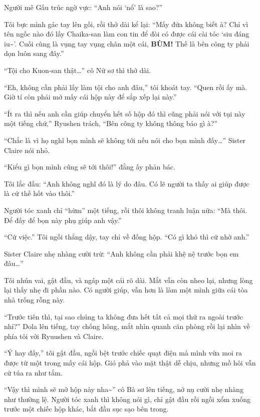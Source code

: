 \documentclass[../main.tex]{subfiles}
\begin{document}
Người mê Gấu trúc ngờ vực: ``Anh nói `nổ' là sao?''

Tôi bực mình gác tay lên gối, rồi thở dài kể lại: ``Mấy đứa không biết à? Chỉ vì tên ngốc nào đó lấy Chaika-san làm con tin để đòi có được cái cài tóc `siu đáng iu\~{}'. Cuối cùng là vụng tay vụng chân một cái, \textbf{BÙM!} Thế là bên công ty phải dọn luôn sang đây.''

``Tội cho Kuon-san thật\dots'' cô Nữ sơ thì thở dài.

``Eh, không cần phải lấy làm tội cho anh đâu,'' tôi khoát tay. ``Quen rồi ấy mà. Giờ tí còn phải mở mấy cái hộp này để sắp xếp lại này.''

``Ít ra thì nếu anh cần giúp chuyển hết số hộp đó thì cũng phải nói với tụi này một tiếng chứ,'' Ryushen trách, ``Bên công ty không thông báo gì à?''

``Chắc là vì họ nghĩ bọn mình sẽ không tới nếu nói cho bọn mình đấy\dots'' Sister Claire nói nhỏ.

``Kiểu gì bọn mình cũng sẽ tới thôi!'' đằng ấy phản bác.

Tôi lắc đầu: ``Anh không nghĩ đó là lý do đâu. Có lẽ người ta thấy ai giúp được là cứ thế hốt vào thôi.''

Người tóc xanh chỉ ``hừm'' một tiếng, rồi thôi không tranh luận nữa: ``Mà thôi. Để đấy để bọn này phụ giúp anh vậy.''

``Cứ việc.'' Tôi ngồi thẳng dậy, tay chỉ về đống hộp. ``Có gì khó thì cứ nhờ anh.''

Sister Claire nhẹ nhàng cười trừ: ``Anh không cần phải khệ nệ trước bọn em đâu\dots''

Tôi nhún vai, gật đầu, và ngáp một cái rõ dài. Mắt vẫn còn nheo lại, nhưng lòng lại thấy nhẹ đi phần nào. Có người giúp, vẫn hơn là làm một mình giữa cái tòa nhà trống rỗng này.

\ct

``Trước tiên thì, tại sao chúng ta không đưa hết tất cả mọi thứ ra ngoài trước nhỉ?'' Dola lên tiếng, tay chống hông, mắt nhìn quanh căn phòng rồi lại nhìn về phía tôi với Ryuushen và Claire.

``Ý hay đấy,'' tôi gật đầu, ngồi bệt trước chiếc quạt điện mà mình vừa moi ra được từ một trong mấy cái hộp. Gió phả vào mặt thật dễ chịu, nhưng mồ hôi vẫn cứ túa ra như tắm.

``Vậy thì mình sẽ mở hộp này nha\~{}'' cô Bà sơ lên tiếng, nở nụ cười nhẹ nhàng như thường lệ. Người tóc xanh thì không nói gì, chỉ gật đầu rồi ngồi xổm xuống trước một chiếc hộp khác, bắt đầu sục sạo bên trong.
\end{document}
